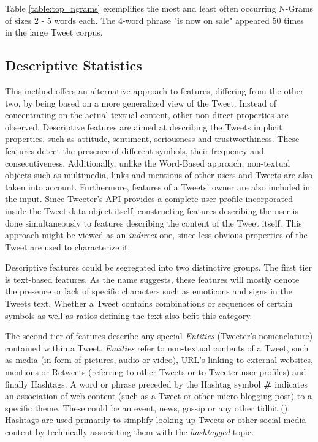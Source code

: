 		Table \ref{table:top_ngrams} exemplifies the most and least often occurring N-Grams of sizes 2 - 5 words each. The 4-word phrase "is now on sale" appeared 50 times in the large Tweet corpus.
	
	\subsection{Descriptive Statistics}
		\label{section:Descriptive_Features}
		This method offers an alternative approach to features, differing from the other two, by being based on a more generalized view of the Tweet. Instead of concentrating on the actual textual content, other non direct properties are observed. Descriptive features are aimed at describing the Tweets implicit properties, such as attitude, sentiment, seriousness and trustworthiness. These features detect the presence of different symbols, their frequency and consecutiveness. Additionally, unlike the Word-Based approach, non-textual objects such as multimedia, links and mentions of other users and Tweets are also taken into account. Furthermore, features of a Tweets' owner are also included in the input. Since Tweeter's API provides a complete user profile incorporated inside the Tweet data object itself, constructing features describing the user is done simultaneously to features describing the content of the Tweet itself. This approach might be viewed as an \textit{indirect} one, since less obvious properties of the Tweet are used to characterize it.
		\par
		Descriptive features could be segregated into two distinctive groups. The first tier is text-based features. As the name suggests, these features will mostly denote the presence or lack of specific characters such as emoticons and signs in the Tweets text. Whether a Tweet contains combinations or sequences of certain symbols as well as ratios defining the text also befit this category.
		\par
		The second tier of features describe any special \textit{Entities} (Tweeter's nomenclature) contained within a Tweet. \textit{Entities} refer to non-textual contents of a Tweet, such as media (in form of pictures, audio or video), URL's linking to external websites, mentions or Retweets (referring to other Tweets or to Tweeter user profiles) and finally Hashtags. A word or phrase preceded by the Hashtag symbol \textbf{\#} indicates an association of web content (such as a Tweet or other micro-blogging post) to a specific theme. These could be an event, news, gossip or any other tidbit (\cite{dict_Tweet}). Hashtags are used primarily to simplify looking up Tweets or other social media content by technically associating them with the \textit{hashtagged} topic.
		
